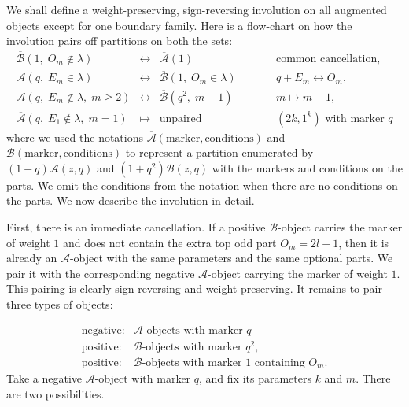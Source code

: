 \documentclass[10pt,a4paper]{amsart}
\numberwithin{equation}{section}
\begin{document}
We shall define a weight-preserving, sign-reversing involution on all augmented
objects except for one boundary family. Here is a flow-chart on how the involution pairs off partitions on both the sets:
\[
\begin{array}{rclcl}
\overline{\mathcal B}(1,\;O_m\notin\lambda)
&\longleftrightarrow&
\overline{\mathcal A}(1)
&\qquad&
\text{common cancellation},\\[2mm]

\overline{\mathcal A}(q,\;E_m\in\lambda)
&\longleftrightarrow&
\overline{\mathcal B}(1,\;O_m\in\lambda)
&\qquad&
q+E_m\leftrightarrow O_m,\\[2mm]

\overline{\mathcal A}(q,\;E_m\notin\lambda,\;m\ge2)
&\longleftrightarrow&
\overline{\mathcal B}(q^2,\;m-1)
&\qquad&
m\mapsto m-1,\\[2mm]

\overline{\mathcal A}(q,\;E_1\notin\lambda,\;m=1)
&\longmapsto&
\text{unpaired}
&\qquad&
(2k,1^k)\text{ with marker }q
\end{array}
\]
where we used the notations $\overline{\mathcal A}(\text{marker},\text{conditions})$ and $\overline{\mathcal B}(\text{marker},\text{conditions})$ to represent a partition enumerated by $(1+q)\mathcal A(z,q)$ and $(1+q^2)\mathcal B(z,q)$ with the markers and conditions on the parts. We omit the conditions from the notation when there are no conditions on the parts. We now describe the involution in detail. 

First, there is an immediate cancellation.  If a positive \(\mathcal B\)-object carries the marker of weight \(1\) and does not contain the extra top odd part \(O_m=2l-1\), then it is already
an \(\mathcal A\)-object with the same parameters and the same optional parts.  We pair
it with the corresponding negative \(\mathcal A\)-object carrying the marker of weight
\(1\).  This pairing is clearly sign-reversing and weight-preserving. It remains to pair three types of objects:

\[
\begin{array}{ll}
\text{negative:}&\mathcal A\text{-objects with marker }q\\
\text{positive:} & \mathcal B\text{-objects with marker }q^2,\\
\text{positive:} & \mathcal B\text{-objects with marker }1\text{ containing }O_m.
\end{array}
\]
Take a negative \(\mathcal A\)-object with marker \(q\), and fix its parameters \(k\) and \(m\).  There are two possibilities.
\end{document}
